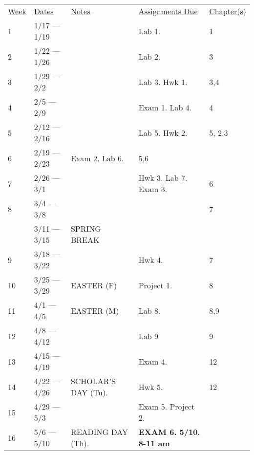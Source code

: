 \documentclass[10pt]{article}
\begin{document}
\begin{center}
\begin{tabular}{lllll}
\underline{Week} & \underline{Dates} & \underline{Notes} & \underline{Assignments Due} & \underline{Chapter(s)}\\
1 & 1/17 --- 1/19 & & Lab 1. & 1 \\
2 & 1/22 --- 1/26 &  & Lab 2. & 3  \\
3 & 1/29 --- 2/2 & & Lab 3. Hwk 1. & 3,4 \\
4 & 2/5 --- 2/9 & & Exam 1. Lab 4.  & 4 \\
5 & 2/12 --- 2/16 & & Lab 5. Hwk 2. & 5, 2.3 \\
6 & 2/19 --- 2/23 & Exam 2. Lab 6.  & 5,6 & \\
7 & 2/26 --- 3/1 &  &  Hwk 3. Lab 7. Exam 3.  & 6 \\
8 & 3/4 --- 3/8 & & & 7 \\
& 3/11 --- 3/15 &  SPRING BREAK & \\
9 & 3/18 --- 3/22 & & Hwk 4. & 7\\
10 & 3/25 --- 3/29 & EASTER (F) & Project 1. & 8 \\
11 & 4/1 --- 4/5 & EASTER (M) & Lab 8.   & 8,9\\
12 & 4/8 --- 4/12 & & Lab 9 & 9 \\
13 & 4/15 --- 4/19 & & Exam 4. & 12 \\
14 & 4/22 --- 4/26 & SCHOLAR'S DAY (Tu). & Hwk 5. & 12 \\
15 & 4/29 --- 5/3 & & Exam 5. Project 2. & \\
16 & 5/6 --- 5/10 & READING DAY (Th).  & \textbf{EXAM 6. 5/10. 8-11 am} & 
\end{tabular}
\end{center}
\end{document}

